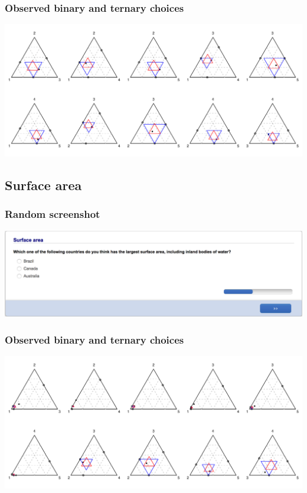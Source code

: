 \documentclass[11pt,letter]{article}
\begin{document}
\subsubsection*{Observed binary and ternary choices}

\includegraphics[width=15cm]{./Population_study_data/Simplexes/Population.pdf}

\pagebreak

\subsection*{Surface area}



\subsubsection*{Random screenshot}

\includegraphics[width=15cm]{Population_study_design/screenshot_Surface_Area.png}

\subsubsection*{Observed binary and ternary choices}

\includegraphics[width=15cm]{./Population_study_data/Simplexes/Surface_area.pdf}
\end{document}
